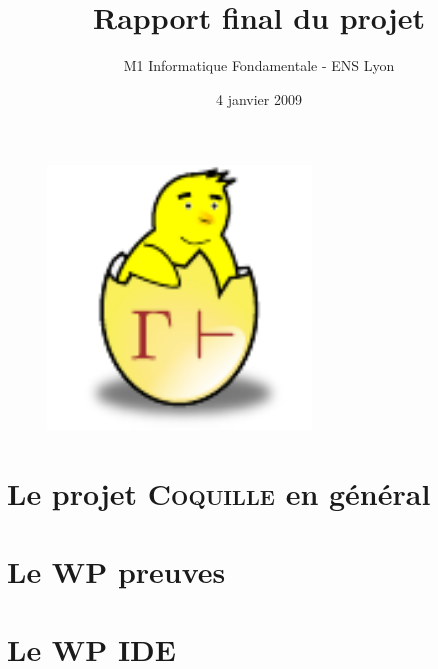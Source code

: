 \documentclass[a4paper,10pt]{article}
\date{4 janvier 2009}
\title{Rapport final du projet \coquille{}}
\author{M1 Informatique Fondamentale - ENS Lyon}
\newcommand{\coquille}{\textsc{Coquille}}
\begin{document}
\begin{figure}
\begin{center}
 \includegraphics[width=7cm]{poussin.pdf}
\end{center}
\end{figure}
\maketitle
\newpage

\tableofcontents
\newpage

\part{Le projet \coquille{} en g\'en\'eral}



\part{Le WP preuves}



\part{Le WP IDE}


% 

\newpage


\end{document}
